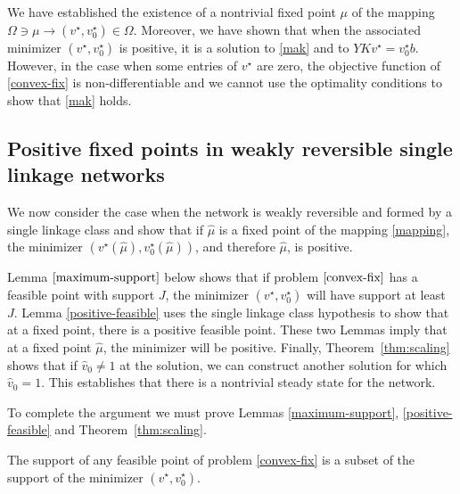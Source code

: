 \documentclass[smallextended]{svjour3}       %
\newcommand*{\0}{\mathbf{0}}
\newcommand*{\1}{\mathbf{1}}
\begin{document}
We have established the existence of a nontrivial fixed point $\mu$ of the
mapping $\Omega \ni \mu \rightarrow (v^\star,v^\star_0)\in \Omega$. Moreover,
we have shown that when the associated minimizer $(v^\star,v^\star_0)$ is
positive, it is a solution to \eqref{mak} and to
$YKv^\star=v^\star_0b$.  However, in the case when some entries of $v^\star$
are zero, the objective function of \eqref{convex-fix} is non-differentiable
and we cannot use the optimality conditions to show that \eqref{mak} holds. 


\subsection{Positive fixed points in weakly reversible single linkage networks}  
\label{section:single-linkage}

We now consider the case when the network is weakly reversible and formed by a single
linkage class and show that if $\hat \mu$ is a fixed point of the
mapping \eqref{mapping}, the minimizer $(v^\star(\hat
\mu),v^\star_0(\hat\mu))$, and therefore $\hat\mu$, is positive.

Lemma $\ref{maximum-support}$ below shows that if problem $\eqref{convex-fix}$ has a
feasible point with support $J$, the minimizer $(v^\star,v^\star_0)$ will have
support at least $J$. Lemma \ref{positive-feasible} uses the single
linkage class hypothesis to show that at a fixed point, there is a
positive feasible point.  These two Lemmas imply that at a fixed point
$\hat{\mu}$, the minimizer will be positive.  Finally, Theorem~\ref{thm:scaling}
shows that if $\hat{v}_0 \neq 1$ at the solution, we can construct another
solution for which $\hat{v}_0=1$. This establishes that there is a nontrivial
steady state for the network. 

To complete the argument we must prove Lemmas \ref{maximum-support},
\ref{positive-feasible} and Theorem~\ref{thm:scaling}.

\begin{lemma} 
	The support of any feasible point of problem \eqref{convex-fix} is a subset
	of the support of the minimizer $(v^\star,v^\star_0)$. 
	\label{maximum-support}
\end{lemma}
\end{document}

